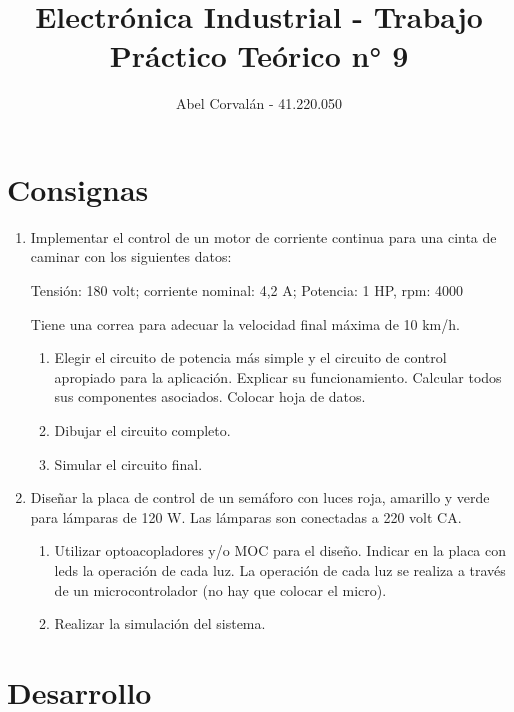 \documentclass{article}
\title{Electrónica Industrial - Trabajo Práctico Teórico n° 9}
\author{Abel Corvalán - 41.220.050}
\date{}
\begin{document}
\maketitle
\section{Consignas}

\begin{enumerate}

\item Implementar el control de un motor de corriente continua para una cinta de caminar con los siguientes datos:

Tensión: 180 volt; corriente nominal: 4,2 A; Potencia: 1 HP, rpm: 4000

Tiene una correa para adecuar la velocidad final máxima de 10 km/h.


\begin{enumerate}[label=\alph*.]
    \item  Elegir el circuito de potencia más simple y el circuito de control apropiado para la aplicación. Explicar su funcionamiento. Calcular todos sus componentes asociados. Colocar hoja de datos.

    \item Dibujar el circuito completo.

    \item Simular el circuito final.
\end{enumerate}

\item Diseñar la placa de control de un semáforo con luces roja, amarillo y verde para lámparas de 120 W. Las lámparas son conectadas a 220 volt CA.

\begin{enumerate}[label=\alph*.]

    \item Utilizar optoacopladores y/o MOC para el diseño. Indicar en la placa con leds la operación de cada luz. La operación de cada luz se realiza a través de un microcontrolador (no hay que colocar el micro).

    \item Realizar la simulación del sistema.
\end{enumerate}
\end{enumerate}

\section{Desarrollo}
\end{document}
